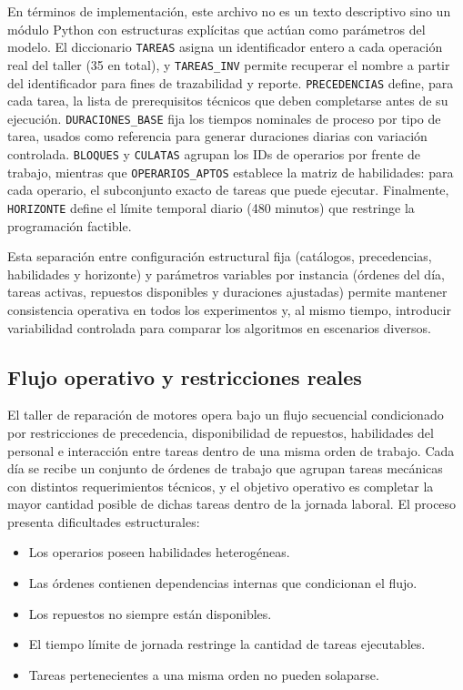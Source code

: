 En términos de implementación, este archivo no es un texto descriptivo sino un módulo Python con
estructuras explícitas que actúan como parámetros del modelo. El diccionario \texttt{TAREAS}
asigna un identificador entero a cada operación real del taller (35 en total), y \texttt{TAREAS\_INV}
permite recuperar el nombre a partir del identificador para fines de trazabilidad y reporte.
\texttt{PRECEDENCIAS} define, para cada tarea, la lista de prerequisitos técnicos que deben
completarse antes de su ejecución. \texttt{DURACIONES\_BASE} fija los tiempos nominales de proceso por
tipo de tarea, usados como referencia para generar duraciones diarias con variación controlada.
\texttt{BLOQUES} y \texttt{CULATAS} agrupan los IDs de operarios por frente de trabajo, mientras que
\texttt{OPERARIOS\_APTOS} establece la matriz de habilidades: para cada operario, el subconjunto exacto
de tareas que puede ejecutar. Finalmente, \texttt{HORIZONTE} define el límite temporal diario (480 minutos)
que restringe la programación factible.

Esta separación entre configuración estructural fija (catálogos, precedencias, habilidades y horizonte)
y parámetros variables por instancia (órdenes del día, tareas activas, repuestos disponibles y duraciones ajustadas)
permite mantener consistencia operativa en todos los experimentos y, al mismo tiempo, introducir variabilidad controlada
para comparar los algoritmos en escenarios diversos.

\subsection{Flujo operativo y restricciones reales}

El taller de reparación de motores opera bajo un flujo secuencial condicionado por 
restricciones de precedencia, disponibilidad de repuestos, habilidades del personal 
e interacción entre tareas dentro de una misma orden de trabajo. Cada día se recibe 
un conjunto de órdenes de trabajo que agrupan tareas mecánicas con distintos requerimientos 
técnicos, y el objetivo operativo es completar la mayor cantidad posible de dichas tareas 
dentro de la jornada laboral. El proceso presenta dificultades estructurales:
\begin{itemize}
    \item Los operarios poseen habilidades heterogéneas.
    \item Las órdenes contienen dependencias internas que condicionan el flujo.
    \item Los repuestos no siempre están disponibles.
    \item El tiempo límite de jornada restringe la cantidad de tareas ejecutables.
    \item Tareas pertenecientes a una misma orden no pueden solaparse.
\end{itemize}

